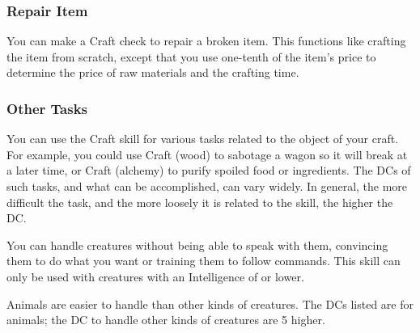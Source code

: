 \subsubsection{Repair Item}
You can make a Craft check to repair a broken item. This functions like crafting the item from scratch, except that you use one-tenth of the item's price to determine the price of raw materials and the crafting time.

\subsubsection{Other Tasks}
You can use the Craft skill for various tasks related to the object of your craft. For example, you could use Craft (wood) to sabotage a wagon so it will break at a later time, or Craft (alchemy) to purify spoiled food or ingredients. The DCs of such tasks, and what can be accomplished, can vary widely. In general, the more difficult the task, and the more loosely it is related to the skill, the higher the DC.

You can handle creatures without being able to speak with them, convincing them to do what you want or training them to follow commands. This skill can only be used with creatures with an Intelligence of  or lower.

Animals are easier to handle than other kinds of creatures. The DCs listed are for animals; the DC to handle other kinds of creatures are 5 higher.

